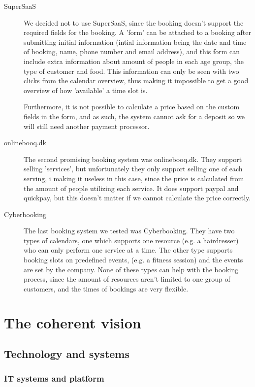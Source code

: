 \begin{description}
\item[SuperSaaS]
We decided not to use SuperSaaS, since the booking doesn’t support the required 
fields for the booking. A 'form' can be attached to a booking after submitting 
initial information (intial information being the date and time of booking, 
name, phone number and email address), and this 
form can include extra information about amount of people in each age group, the
type of customer and food. This information can only be seen with two clicks 
from the calendar overview, thus making it impossible to get a good overview of 
how 'available' a time slot is.

Furthermore, it is not possible to calculate a price based on the custom fields 
in the form, and as such, the system cannot ask for a deposit so we will still 
need another payment processor.

\item[onlinebooq.dk]
The second promising booking system was onlinebooq.dk. They support selling 
'services', but unfortunately they only support selling one of each serving, i
making it useless in this case, since the price is calculated from the amount of
people utilizing each service. It does support paypal and quickpay, but this 
doesn't matter if we cannot calculate the price correctly.

\item[Cyberbooking]
The last booking system we tested was Cyberbooking. They have two types of 
calendars, one which supports one resource (e.g. a hairdresser) who can only
perform one service at a time. The other type supports booking slots on 
predefined events, (e.g. a fitness session) and the events are set by the 
company. None of these types can help \gomonkey{} with the booking process,
since the amount of resources aren't limited to one group of customers, and 
the times of bookings are very flexible.

\end{description}


\section{The coherent vision}
\subsection{Technology and systems}
\subsubsection{IT systems and platform}

